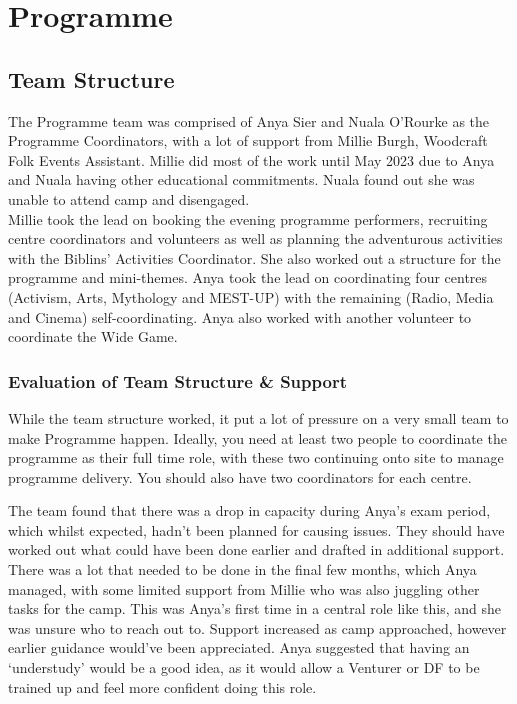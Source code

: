 \chapter{Programme}
\section{Team Structure}
The Programme team was comprised of Anya Sier and Nuala O'Rourke as the Programme Coordinators, with a lot of support from Millie Burgh, Woodcraft Folk Events Assistant. Millie did most of the work until May 2023 due to Anya and Nuala having other educational commitments. Nuala found out she was unable to attend camp and disengaged. \\

Millie took the lead on booking the evening programme performers, recruiting centre coordinators and volunteers as well as planning the adventurous activities with the Biblins' Activities Coordinator. She also worked out a structure for the programme and mini-themes. Anya took the lead on coordinating four centres (Activism, Arts, Mythology and MEST-UP) with the remaining (Radio, Media and Cinema) self-coordinating. Anya also worked with another volunteer to coordinate the Wide Game.
\subsection{Evaluation of Team Structure \& Support}
While the team structure worked, it put a lot of pressure on a very small team to make Programme happen. Ideally, you need at least two people to coordinate the programme as their full time role, with these two continuing onto site to manage programme delivery. You should also have two coordinators for each centre. 

The team found that there was a drop in capacity during Anya's exam period, which whilst expected, hadn't been planned for causing issues. They should have worked out what could have been done earlier and drafted in additional support. \\

There was a lot that needed to be done in the final few months, which Anya managed, with some limited support from Millie who was also juggling other tasks for the camp. This was Anya's first time in a central role like this, and she was unsure who to reach out to. Support increased as camp approached, however earlier guidance would've been appreciated. Anya suggested that having an `understudy' would be a good idea, as it would allow a Venturer or DF to be trained up and feel more confident doing this role.


